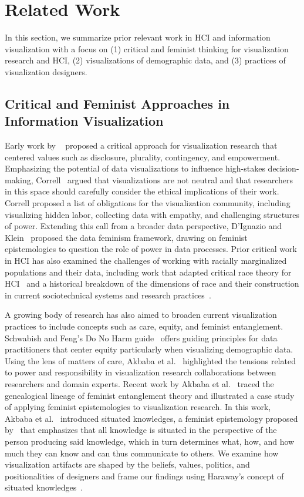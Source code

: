 \section{Related Work}
In this section, we summarize prior relevant work in HCI and information visualization with a focus on (1) critical and feminist thinking for visualization research and HCI, (2) visualizations of demographic data, and (3) practices of visualization designers. 

\subsection{Critical and Feminist Approaches in Information Visualization}
Early work by ~\citet{dork} proposed a critical approach for visualization research that centered values such as disclosure, plurality, contingency, and empowerment. Emphasizing the potential of data visualizations to influence high-stakes decision-making, Correll~\cite{Correll} argued that visualizations are not neutral and that researchers in this space should carefully consider the ethical implications of their work. Correll proposed a list of obligations for the visualization community, including visualizing hidden labor, collecting data with empathy, and challenging structures of power. Extending this call from a broader data perspective, D'Ignazio and Klein~\cite{datafem} proposed the data feminism framework, drawing on feminist epistemologies to question the role of power in data processes. Prior critical work in HCI has also examined the challenges of working with racially marginalized populations and their data, including work that adapted critical race theory for HCI~\cite{Ogbonnaya2020} and a historical breakdown of the dimensions of race and their construction in current sociotechnical systems and research practices~\cite{hanna2020towards}.

A growing body of research has also aimed to broaden current visualization practices to include concepts such as care, equity, and feminist entanglement. Schwabish and Feng's Do No Harm guide~\cite{SchwabishFeng} offers guiding principles for data practitioners that center equity particularly when visualizing demographic data. Using the lens of matters of care, Akbaba et al.~\cite{akbaba2023troubling} highlighted the tensions related to power and responsibility in visualization research collaborations between researchers and domain experts. Recent work by Akbaba et al.~\cite{akbaba2024entanglements} traced the genealogical lineage of feminist entanglement theory and illustrated a case study of applying feminist epistemologies to visualization research. In this work, Akbaba et al.~\cite{akbaba2024entanglements} introduced situated knowledges, a feminist epistemology proposed by~\citet{haraway1988situated} that emphasizes that all knowledge is situated in the perspective of the person producing said knowledge, which in turn determines what, how, and how much they can know and can thus communicate to others. We examine how visualization artifacts are shaped by the beliefs, values, politics, and positionalities of designers and frame our findings using Haraway's concept of situated knowledges~\cite{haraway1988situated}. 

